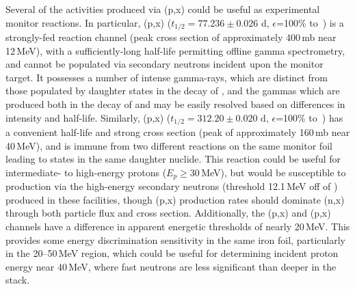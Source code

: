 Several of the activities produced via (p,x)  could be useful as experimental monitor reactions. 
In particular, (p,x) ($t_{1/2}=77.236\pm0.026$ d, $\epsilon$=100\% to \,\cite{Junde2011})  is a strongly-fed reaction channel (peak cross section of approximately 400\,mb near 12\,MeV), with a sufficiently-long half-life permitting offline gamma spectrometry,  and  cannot be populated via secondary neutrons incident upon the monitor target. 
It possesses a number of intense gamma-rays, which are distinct from those populated by daughter states in the decay of  , and the gammas which are produced both in the decay of   and   may be easily resolved based on differences in intensity and half-life. 
Similarly,  (p,x)  ($t_{1/2}=312.20\pm0.020$ d, $\epsilon$=100\% to \,\cite{Dong2014}) has a convenient half-life and strong cross section (peak of approximately 160\,mb near 40\,MeV), and is immune from two different reactions on the same monitor foil leading to states in the same daughter nuclide.
This reaction could be useful for intermediate- to high-energy protons ($E_p \geq$30\,MeV), but would be susceptible to production via the high-energy secondary neutrons  (threshold 12.1\,MeV off of ) produced in these facilities, though (p,x) production rates should dominate (n,x) through both particle flux and cross section. 
Additionally, the (p,x) and (p,x) channels have a difference in apparent energetic thresholds of nearly 20\,MeV.
This provides some energy discrimination sensitivity in the same iron foil, particularly in the 20--50\,MeV region, which could be useful for determining incident proton energy near 40\,MeV, where fast neutrons are less significant than deeper in the stack.








